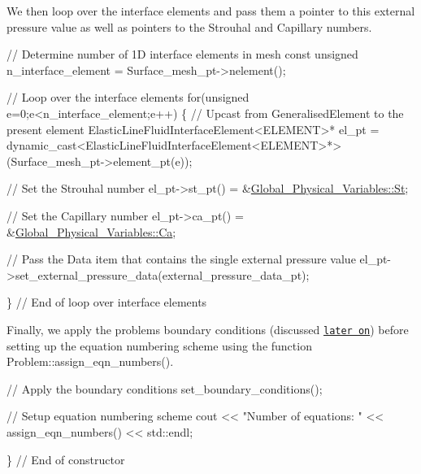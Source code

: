 We then loop over the interface elements and pass them a pointer to this external pressure value as well as pointers to the Strouhal and Capillary numbers.


\begin{DoxyCodeInclude}
 \textcolor{comment}{// Determine number of 1D interface elements in mesh}
 \textcolor{keyword}{const} \textcolor{keywordtype}{unsigned} n\_interface\_element = Surface\_mesh\_pt->nelement();

 \textcolor{comment}{// Loop over the interface elements}
 \textcolor{keywordflow}{for}(\textcolor{keywordtype}{unsigned} e=0;e<n\_interface\_element;e++)
  \{
   \textcolor{comment}{// Upcast from GeneralisedElement to the present element}
   ElasticLineFluidInterfaceElement<ELEMENT>* el\_pt = 
    \textcolor{keyword}{dynamic\_cast<}ElasticLineFluidInterfaceElement<ELEMENT>*\textcolor{keyword}{>}
    (Surface\_mesh\_pt->element\_pt(e));

   \textcolor{comment}{// Set the Strouhal number}
   el\_pt->st\_pt() = &\hyperlink{namespaceGlobal__Physical__Variables_a4b6ef72bd221361c37f5b9a4a6899afc}{Global\_Physical\_Variables::St};

   \textcolor{comment}{// Set the Capillary number}
   el\_pt->ca\_pt() = &\hyperlink{namespaceGlobal__Physical__Variables_a8b32b93d2e546f9375ec418474107838}{Global\_Physical\_Variables::Ca};

   \textcolor{comment}{// Pass the Data item that contains the single external pressure value}
   el\_pt->set\_external\_pressure\_data(external\_pressure\_data\_pt);

  \} \textcolor{comment}{// End of loop over interface elements}

\end{DoxyCodeInclude}


Finally, we apply the problem\textquotesingle{}s boundary conditions (discussed \href{#set_boundary_conditions}{\tt later on}) before setting up the equation numbering scheme using the function {\ttfamily Problem\+::assign\+\_\+eqn\+\_\+numbers()}.


\begin{DoxyCodeInclude}
 \textcolor{comment}{// Apply the boundary conditions}
 set\_boundary\_conditions();

 \textcolor{comment}{// Setup equation numbering scheme}
 cout << \textcolor{stringliteral}{"Number of equations: "} << assign\_eqn\_numbers() << std::endl;

\} \textcolor{comment}{// End of constructor}

\end{DoxyCodeInclude}




